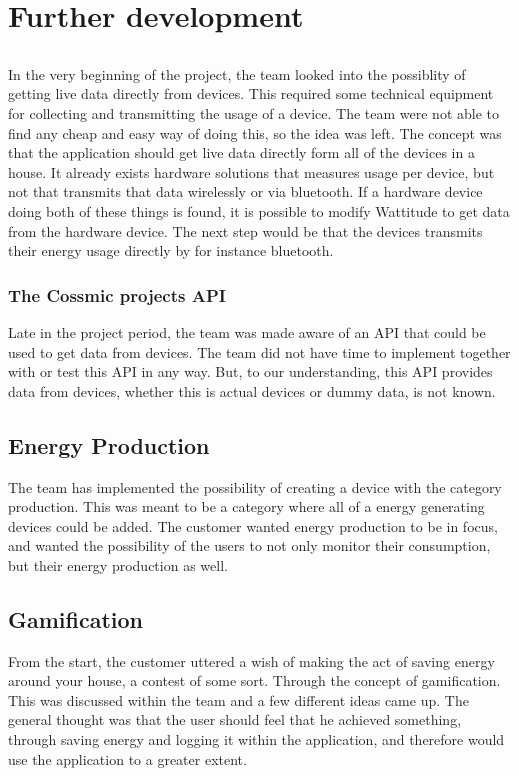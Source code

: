 \chapter{Further development}
\label{sec:further}
\section{}
In the very beginning of the project, the team looked into the possiblity of getting live data directly from devices. This required some technical equipment for collecting and transmitting the usage of a device. The team were not able to find any cheap and easy way of doing this, so the idea was left. The concept was that the application should get live data directly form all of the devices in a house. It already exists hardware solutions that measures usage per device, but not that transmits that data wirelessly or via bluetooth. If a hardware device doing both of these things is found, it is possible to modify Wattitude to get data from the hardware device. The next step would be that the devices transmits their energy usage directly by for instance bluetooth. 

\subsection{The Cossmic projects API}
Late in the project period, the team was made aware of an API that could be used to get data from devices. The team did not have time to implement together with or test this API in any way. But, to our understanding, this API provides data from devices, whether this is actual devices or dummy data, is not known. 

\section{Energy Production}
The team has implemented the possibility of creating a device with the category production. This was meant to be a category where all of a  energy generating devices could be added. The customer wanted energy production to be in focus, and wanted the possibility of the users to not only monitor their consumption, but their energy production as well. 

\section{Gamification}
From the start, the customer uttered a wish of making the act of saving energy around your house, a contest of some sort. Through the concept of gamification. This was discussed within the team and a few different ideas came up. The general thought was that the user should feel that he achieved something, through saving energy and logging it within the application, and therefore would use the application to a greater extent. 

